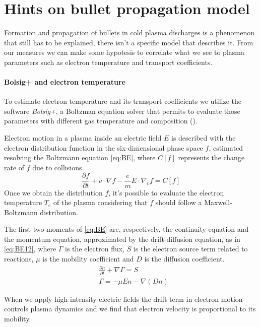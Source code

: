 \section{Hints on bullet propagation model}
Formation and propagation of bullets in cold plasma discharges is a phenomenon that still has to be explained, there isn't a specific model that describes it.
From our measures we can make some hypotesis to correlate what we see to plasma parameters such as electron temperature and transport coefficients.

\paragraph{Bolsig+ and electron temperature}
To estimate electron temperature and its transport coefficients we utilize the software \emph{Bolsig+}, a Boltzman equation solver that permits to evaluate those parameters with different gas temperature and composition (\cite{Hagelaar_2005}).

Electron motion in a plasma inside an electric field $E$ is described with the electron distribution function in the six-dimensional phase space $f$, estimated resolving the Boltzmann equation \ref{eq:BE}, where $C[f]$ represents the change rate of $f$ due to collisions.
\begin{equation}
\frac{\partial f}{\partial t} + v \cdot \nabla f - \frac{e}{m} E \cdot \nabla_{v} f = C[f]
 \label{eq:BE}
\end{equation}
Once we obtain the distribution $f$, it's possible to evaluate the electron temperature $T_{e}$ of the plasma considering that $f$ should follow a Maxwell-Boltzmann distribution.


The first two moments of \ref{eq:BE} are, respectively, the continuity equation and the momentum equation, approximated by the drift-diffusion equation, as in \ref{eq:BE12}, where $\Gamma$ is the electron flux, $S$ is the electron source term related to reactions, $\mu$ is the mobility coefficient and $D$ is the diffusion coefficient.
\begin{equation}
 \begin{split}
 &\frac{\partial n}{\partial t} + \nabla \Gamma = S \\
 &\Gamma = -\mu E n - \nabla (D n)
 \end{split}
 \label{eq:BE12}
\end{equation}

When we apply high intensity electric fields the drift term in electron motion controls plasma dynamics and we find that electron velocity is proportional to its mobility.

